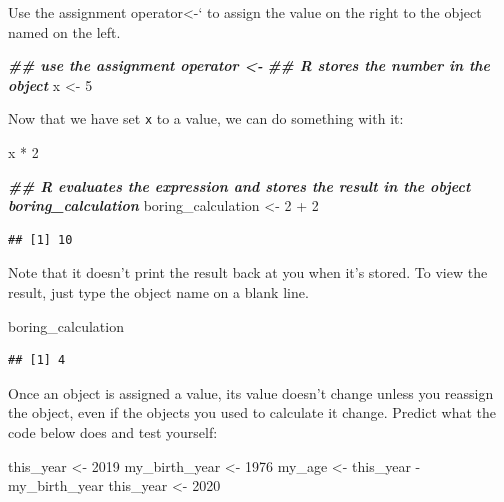 \documentclass[
  oneside]{book}
\newenvironment{Shaded}{\begin{snugshade}}{\end{snugshade}}
\newcommand{\DecValTok}[1]{\textcolor[rgb]{0.00,0.00,0.81}{#1}}
\newcommand{\DocumentationTok}[1]{\textcolor[rgb]{0.56,0.35,0.01}{\textbf{\textit{#1}}}}
\newcommand{\NormalTok}[1]{#1}
\newcommand{\OtherTok}[1]{\textcolor[rgb]{0.56,0.35,0.01}{#1}}
\newcommand{\SpecialCharTok}[1]{\textcolor[rgb]{0.00,0.00,0.00}{#1}}
\begin{document}
Use the assignment operator\textless-` to assign the value on the right to the object named on the left.

\begin{Shaded}
\begin{Highlighting}[]
\DocumentationTok{\#\# use the assignment operator \textquotesingle{}\textless{}{-}\textquotesingle{}}
\DocumentationTok{\#\# R stores the number in the object}
\NormalTok{x }\OtherTok{\textless{}{-}} \DecValTok{5}
\end{Highlighting}
\end{Shaded}

Now that we have set \texttt{x} to a value, we can do something with it:

\begin{Shaded}
\begin{Highlighting}[]
\NormalTok{x }\SpecialCharTok{*} \DecValTok{2}

\DocumentationTok{\#\# R evaluates the expression and stores the result in the object boring\_calculation}
\NormalTok{boring\_calculation }\OtherTok{\textless{}{-}} \DecValTok{2} \SpecialCharTok{+} \DecValTok{2}
\end{Highlighting}
\end{Shaded}

\begin{verbatim}
## [1] 10
\end{verbatim}

Note that it doesn't print the result back at you when it's stored. To view the result, just type the object name on a blank line.

\begin{Shaded}
\begin{Highlighting}[]
\NormalTok{boring\_calculation}
\end{Highlighting}
\end{Shaded}

\begin{verbatim}
## [1] 4
\end{verbatim}

Once an object is assigned a value, its value doesn't change unless you reassign the object, even if the objects you used to calculate it change. Predict what the code below does and test yourself:

\begin{Shaded}
\begin{Highlighting}[]
\NormalTok{this\_year }\OtherTok{\textless{}{-}} \DecValTok{2019}
\NormalTok{my\_birth\_year }\OtherTok{\textless{}{-}} \DecValTok{1976}
\NormalTok{my\_age }\OtherTok{\textless{}{-}}\NormalTok{ this\_year }\SpecialCharTok{{-}}\NormalTok{ my\_birth\_year}
\NormalTok{this\_year }\OtherTok{\textless{}{-}} \DecValTok{2020}
\end{Highlighting}
\end{Shaded}
\end{document}
